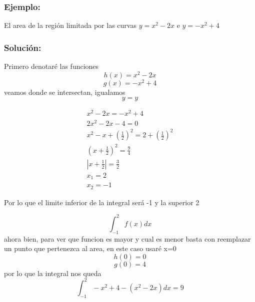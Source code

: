 \documentclass[12pt]{article}
\begin{document}
\subsubsection*{Ejemplo:} 
El area de la región limitada por las curvas $y=x^2-2x$ e $y=-x^2+4$

\subsubsection*{Solución:}
Primero denotaré las funciones
$$h(x)=x^2-2x$$
$$g(x)=-x^2+4$$
veamos donde se intersectan, igualamos $$y=y$$
\begin{center}
\begin{align*}
x^2 - 2x = -x^2 + 4 \\
2x^2 - 2x - 4 = 0 \\
x^2 - x + \left(\frac{1}{2}\right)^2 = 2 + \left(\frac{1}{2}\right)^2 \\
\left(x + \frac{1}{2}\right)^2 = \frac{9}{4} \\
\left|x + \frac{1}{2}\right| = \frac{3}{2} \\
x_1 = 2 \\
x_2=-1
\end{align*}
\end{center}
Por lo que el limite inferior de la integral será -1 y la superior 2

$$\int_{-1}^2 f(x)dx$$
ahora bien, para ver que funcion es mayor y cual es menor basta con reemplazar un punto que pertenezca al area, en este caso usaré x=0
$$h(0)=0$$
$$g(0)=4$$
por lo que la integral nos queda
$$\int_{-1}^2 -x^2+4-(x^2-2x) dx=9$$
\begin{center}
\end{center}
\end{document}
